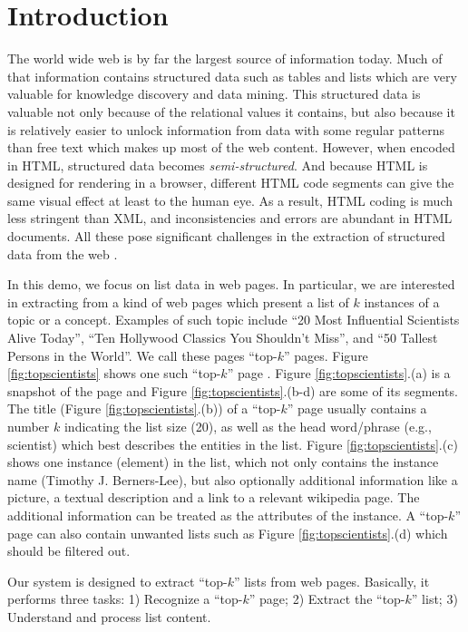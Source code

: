 \section{Introduction}
\label{sec:intro}
The world wide web is by far the largest source of information today.
Much of that information contains structured data such as tables and lists
which are very valuable for knowledge discovery and data mining. 
This structured data is valuable not only because of the relational
values it contains, but also because it is relatively easier to unlock
information from data with some regular patterns than free text which
makes up most of the web content. However, when encoded in HTML, 
structured data becomes {\em semi-structured}. 
And because HTML is designed for rendering in a browser, different
HTML code segments can give the same visual effect at least to
the human eye. As a result, 
HTML coding is much less stringent than XML, and
inconsistencies and errors are abundant in HTML documents. 
All these pose significant challenges in the extraction of structured 
data from the web \cite{Weninger10:UnexpectedList}.

In this demo, we focus on list data in web pages. In particular, we are 
interested in extracting from a kind of web pages which present
a list of $k$ instances of a topic or a concept. Examples of such topic include 
``20 Most Influential Scientists Alive Today'', 
``Ten Hollywood Classics You Shouldn't Miss'', 
and ``50 Tallest Persons in the World''. 
We call these pages ``top-$k$'' pages.
Figure \ref{fig:topscientists}
shows one such ``top-$k$'' page \cite{InfluentialScientists}.
Figure \ref{fig:topscientists}.(a) is a snapshot of the page 
and Figure \ref{fig:topscientists}.(b-d) are some of its segments.
The title (Figure \ref{fig:topscientists}.(b)) of a ``top-$k$'' page 
usually contains a number $k$ indicating the list size (20),
as well as the head word/phrase (e.g., scientist) which best describes 
the entities in the list. Figure \ref{fig:topscientists}.(c) shows one 
instance (element) in the list, which not only contains the instance name 
(Timothy J. Berners-Lee), but also optionally additional information like 
a picture, a textual description and a link to a relevant wikipedia page. 
The additional information can be treated as the attributes of the instance. 
A ``top-$k$'' page can also contain unwanted lists
such as Figure \ref{fig:topscientists}.(d) which
should be filtered out.

\begin{figure*}[th]
        \centering
        \caption{Snapshot of a typical  ``top-k'' page
	\cite{InfluentialScientists} and its page segments}
        \label{fig:topscientists}
\end{figure*}
Our system is designed to extract ``top-$k$'' lists from web pages.
Basically, it performs three tasks:
1) Recognize a ``top-$k$'' page;
2) Extract the ``top-$k$'' list;
3) Understand and process list content. 

